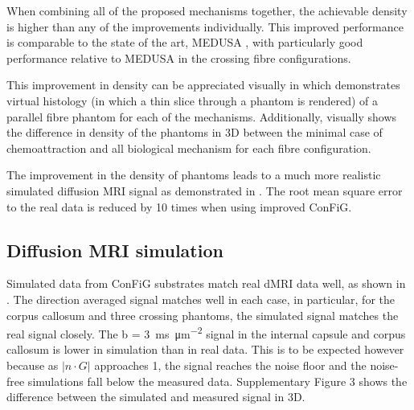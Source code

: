 When combining all of the proposed mechanisms together, the achievable density is higher than any of the improvements individually. This improved performance is comparable to the state of the art, MEDUSA \cite{Ginsburger2019}, with particularly good performance relative to MEDUSA in the crossing fibre configurations.

This improvement in density can be appreciated visually in  which demonstrates virtual histology (in which a thin slice through a phantom is rendered) of a parallel fibre phantom for each of the mechanisms. Additionally,  visually shows the difference in density of the phantoms in 3D between the minimal case of chemoattraction and all biological mechanism for each fibre configuration.

The improvement in the density of phantoms leads to a much more realistic simulated diffusion \ac{MRI} signal as demonstrated in . The root mean square error to the real data is reduced by 10 times when using improved \ac{ConFiG}.


\subsection{Diffusion \ac{MRI} simulation}
\label{sec:config_result_dmri_sim}
Simulated data from \ac{ConFiG} substrates match real \ac{dMRI} data well, as shown in . The direction averaged signal matches well in each case, in particular, for the corpus callosum and three crossing phantoms, the simulated signal matches the real signal closely. The b = \SI{3}{\milli\second\per\micro\metre\squared} signal in the internal capsule and corpus callosum is lower in simulation than in real data. This is to be expected however because as $|n\cdot G|$ approaches 1, the signal reaches the noise floor and the noise-free simulations fall below the measured data. Supplementary Figure 3 shows the difference between the simulated and measured signal in 3D.

